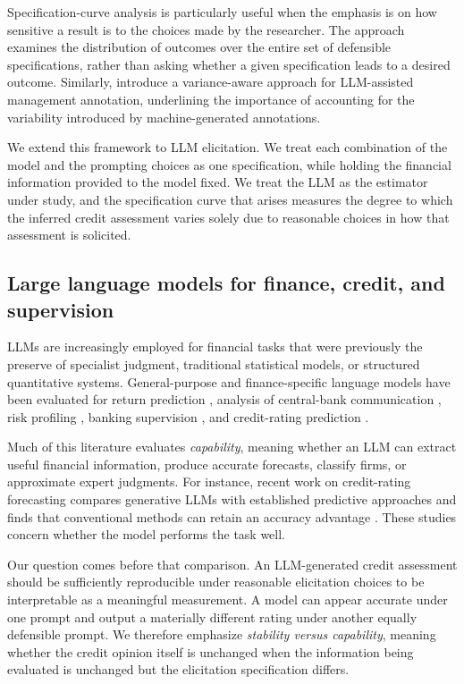 \documentclass[a4paper,fleqn]{cas-sc}
\begin{document}
Specification-curve analysis is particularly useful when the emphasis is on how sensitive a result is to
the choices made by the researcher. The approach examines the distribution of outcomes over the entire
set of defensible specifications, rather than asking whether a given specification leads to a desired
outcome. Similarly, \citet{camuffo2026variance} introduce a variance-aware approach for
LLM-assisted management annotation, underlining the importance of accounting for the variability
introduced by machine-generated annotations.

We extend this framework to LLM elicitation. We treat each combination of the model and the prompting
choices as one specification, while holding the financial information provided to the model fixed. We
treat the LLM as the estimator under study, and the specification curve that arises
measures the degree to which the inferred credit assessment varies solely due to reasonable choices in
how that assessment is solicited.

\subsection{Large language models for finance, credit, and supervision}
LLMs are increasingly employed for financial tasks that were previously the preserve of specialist
judgment, traditional statistical models, or structured quantitative systems. General-purpose
\citep{brown2020gpt3,ouyang2022instruct,achiam2023gpt4} and finance-specific
\citep{wu2023bloomberggpt,xie2023pixiu} language models have been evaluated for
return prediction \citep{lopezlira2023chatgpt}, analysis of central-bank
communication \citep{hansen2024fedspeak}, risk profiling \citep{hens2025risk}, banking supervision
\citep{garciallorente2026banking}, and credit-rating prediction \citep{drinkall2025forecasting}.

Much of this literature evaluates \emph{capability}, meaning whether an LLM can extract useful financial
information, produce accurate forecasts, classify firms, or approximate expert judgments. For instance,
recent work on credit-rating forecasting compares generative LLMs with established predictive approaches
and finds that conventional methods can retain an accuracy advantage \citep{drinkall2025forecasting}.
These studies concern whether the model performs the task well.

Our question comes before that comparison. An LLM-generated credit assessment should be sufficiently
reproducible under reasonable elicitation choices to be interpretable as a meaningful measurement. A
model can appear accurate under one prompt and output a materially different rating under another equally
defensible prompt. We therefore emphasize \emph{stability versus capability}, meaning whether the credit opinion
itself is unchanged when the information being evaluated is unchanged but the elicitation specification
differs.
\end{document}
